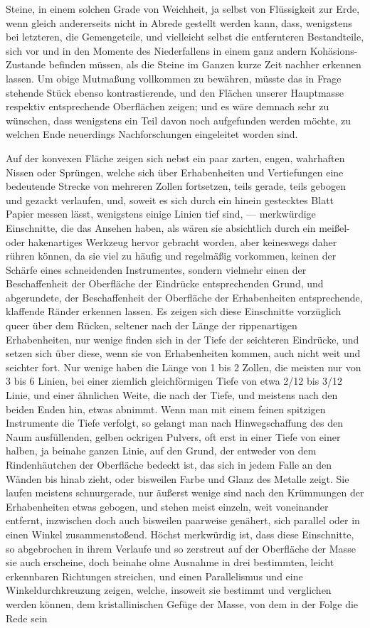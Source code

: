 \documentclass[a4paper, 11pt, oneside, german]{article}
\begin{document}
Steine, in einem solchen Grade von Weichheit, ja selbst von Flüssigkeit zur Erde, wenn gleich andererseits nicht in Abrede gestellt werden kann, dass, wenigstens bei letzteren, die Gemengeteile, und vielleicht selbst die entfernteren Bestandteile, sich vor und in den Momente des Niederfallens in einem ganz andern Kohäsions-Zustande befinden müssen, als die Steine im Ganzen kurze Zeit nachher erkennen lassen.  
Um obige Mutmaßung vollkommen zu bewähren, müsste das in Frage stehende Stück ebenso kontrastierende, und den Flächen unserer Hauptmasse respektiv entsprechende Oberflächen zeigen; und es wäre demnach sehr zu wünschen, dass wenigstens ein Teil davon noch aufgefunden werden möchte, zu welchen Ende neuerdings Nachforschungen eingeleitet worden sind.

Auf der konvexen Fläche zeigen sich nebst ein paar zarten, engen, wahrhaften Nissen oder Sprüngen, welche sich über Erhabenheiten und Vertiefungen eine bedeutende Strecke von mehreren Zollen fortsetzen, teils gerade, teils gebogen und gezackt verlaufen, und, soweit es sich durch ein hinein gestecktes Blatt Papier messen lässt, wenigstens einige Linien tief sind, --- merkwürdige Einschnitte, die das Ansehen haben, als wären sie absichtlich durch ein meißel- oder hakenartiges Werkzeug hervor gebracht worden, aber keineswegs daher rühren können, da sie viel zu häufig und regelmäßig vorkommen, keinen der Schärfe eines schneidenden Instrumentes, sondern vielmehr einen der Beschaffenheit der Oberfläche der Eindrücke entsprechenden Grund, und abgerundete, der Beschaffenheit der Oberfläche der Erhabenheiten entsprechende, klaffende Ränder erkennen lassen. Es zeigen sich diese Einschnitte vorzüglich queer über dem Rücken, seltener nach der Länge der rippenartigen Erhabenheiten, nur wenige finden sich in der Tiefe der seichteren Eindrücke, und setzen sich über diese, wenn sie von Erhabenheiten kommen, auch nicht weit und seichter fort. Nur wenige haben die Länge von 1 bis 2 Zollen, die meisten nur von 3 bis 6 Linien, bei einer ziemlich gleichförmigen Tiefe von etwa 2/12 bis 3/12 Linie, und einer ähnlichen Weite, die nach der Tiefe, und meistens nach den beiden Enden hin, etwas abnimmt. Wenn man mit einem feinen spitzigen Instrumente die Tiefe verfolgt, so gelangt man nach Hinwegschaffung des den Naum ausfüllenden, gelben ockrigen Pulvers, oft erst in einer Tiefe von einer halben, ja beinahe ganzen Linie, auf den Grund, der entweder von dem Rindenhäutchen der Oberfläche bedeckt ist, das sich in jedem Falle an den Wänden bis hinab zieht, oder bisweilen Farbe und Glanz des Metalle zeigt. Sie laufen meistens schnurgerade, nur äußerst wenige sind nach den Krümmungen der Erhabenheiten etwas gebogen, und stehen meist einzeln, weit voneinander entfernt, inzwischen doch auch bisweilen paarweise genähert, sich parallel oder in einen Winkel zusammenstoßend. Höchst merkwürdig ist, dass diese Einschnitte, so abgebrochen in ihrem Verlaufe und so zerstreut auf der Oberfläche der Masse sie auch erscheine, doch beinahe ohne Ausnahme in drei bestimmten, leicht erkennbaren Richtungen streichen, und einen Parallelismus und eine Winkeldurchkreuzung zeigen, welche, insoweit sie bestimmt und verglichen werden können, dem kristallinischen Gefüge der Masse, von dem in der Folge die Rede sein 
\end{document}
